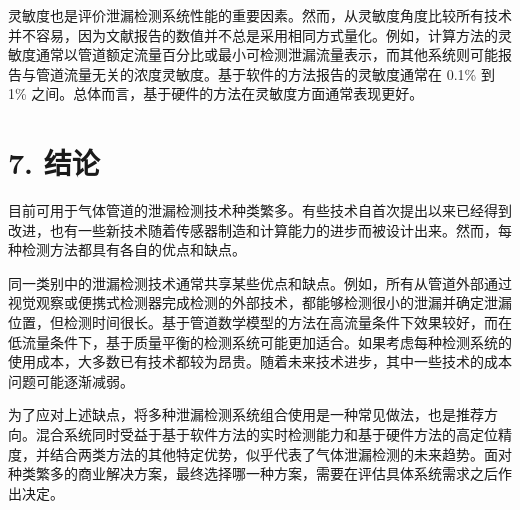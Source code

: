 灵敏度也是评价泄漏检测系统性能的重要因素。然而，从灵敏度角度比较所有技术并不容易，因为文献报告的数值并不总是采用相同方式量化。例如，计算方法的灵敏度通常以管道额定流量百分比或最小可检测泄漏流量表示，而其他系统则可能报告与管道流量无关的浓度灵敏度。基于软件的方法报告的灵敏度通常在 0.1\% 到 1\% 之间。总体而言，基于硬件的方法在灵敏度方面通常表现更好。

\section*{7. 结论}

目前可用于气体管道的泄漏检测技术种类繁多。有些技术自首次提出以来已经得到改进，也有一些新技术随着传感器制造和计算能力的进步而被设计出来。然而，每种检测方法都具有各自的优点和缺点。

同一类别中的泄漏检测技术通常共享某些优点和缺点。例如，所有从管道外部通过视觉观察或便携式检测器完成检测的外部技术，都能够检测很小的泄漏并确定泄漏位置，但检测时间很长。基于管道数学模型的方法在高流量条件下效果较好，而在低流量条件下，基于质量平衡的检测系统可能更加适合。如果考虑每种检测系统的使用成本，大多数已有技术都较为昂贵。随着未来技术进步，其中一些技术的成本问题可能逐渐减弱。

为了应对上述缺点，将多种泄漏检测系统组合使用是一种常见做法，也是推荐方向。混合系统同时受益于基于软件方法的实时检测能力和基于硬件方法的高定位精度，并结合两类方法的其他特定优势，似乎代表了气体泄漏检测的未来趋势。面对种类繁多的商业解决方案，最终选择哪一种方案，需要在评估具体系统需求之后作出决定。
